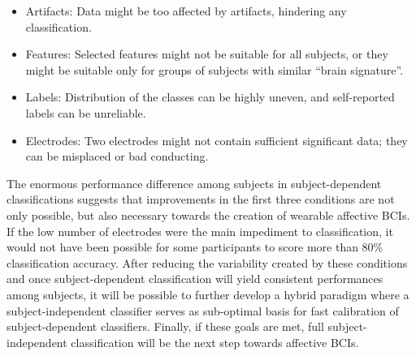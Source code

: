 \begin{itemize}
\item 	Artifacts: Data might be too affected by artifacts, hindering any classification.
\item 	Features: Selected features might not be suitable for all subjects, or they might be suitable only for groups of subjects with similar “brain signature”.
\item 	Labels: Distribution of the classes can be highly uneven, and self-reported labels can be unreliable.
\item 	Electrodes: Two electrodes might not contain sufficient significant data; they can be misplaced or bad conducting.
\end{itemize}
The enormous performance difference among subjects in subject-dependent classifications suggests that improvements in the first three conditions are not only possible, but also necessary towards the creation of wearable affective \ac{BCI}s. If the low number of electrodes were the main impediment to classification, it would not have been possible for some participants to score more than 80\% classification accuracy. After reducing the variability created by these conditions and once subject-dependent classification will yield consistent performances among subjects, it will be possible to further develop a hybrid paradigm where a subject-independent classifier serves as sub-optimal basis for fast calibration of subject-dependent classifiers. Finally, if these goals are met, full subject-independent classification will be the next step towards affective \ac{BCI}s.
